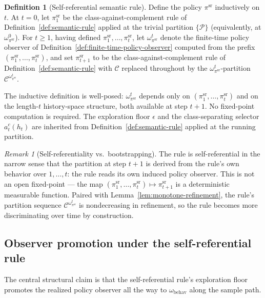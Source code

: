 \documentclass[11pt]{article}
\theoremstyle{definition}
\newtheorem{definition}[theorem]{Definition}
\theoremstyle{remark}
\newtheorem{remark}[theorem]{Remark}
\newcommand{\Ccal}{\mathcal{C}}
\newcommand{\Pcal}{\mathcal{P}}
\begin{document}
\begin{definition}[Self-referential semantic rule]
\label{def:self-ref-rule}
Define the policy $\pi^{\mathrm{sr}}$ inductively on $t$. At $t=0$, let $\pi^{\mathrm{sr}}_1$ be the class-against-complement rule of Definition~\ref{def:semantic-rule} applied at the trivial partition $\{\Pcal\}$ (equivalently, at $\omega_{\pi^{\mathrm{sr}}}^0$). For $t\ge 1$, having defined $\pi^{\mathrm{sr}}_1,\dots,\pi^{\mathrm{sr}}_t$, let $\omega_{\pi^{\mathrm{sr}}}^t$ denote the finite-time policy observer of Definition~\ref{def:finite-time-policy-observer} computed from the prefix $(\pi^{\mathrm{sr}}_1,\dots,\pi^{\mathrm{sr}}_t)$, and set $\pi^{\mathrm{sr}}_{t+1}$ to be the class-against-complement rule of Definition~\ref{def:semantic-rule} with $\Ccal$ replaced throughout by the $\omega_{\pi^{\mathrm{sr}}}^t$-partition $\Ccal^{\omega_{\pi^{\mathrm{sr}}}^t}$.
\end{definition}

The inductive definition is well-posed: $\omega_{\pi^{\mathrm{sr}}}^t$ depends only on $(\pi^{\mathrm{sr}}_1,\dots,\pi^{\mathrm{sr}}_t)$ and on the length-$t$ history-space structure, both available at step $t+1$. No fixed-point computation is required. The exploration floor $\epsilon$ and the class-separating selector $a_t^c(h_t)$ are inherited from Definition~\ref{def:semantic-rule} applied at the running partition.

\begin{remark}[Self-referentiality vs.\ bootstrapping]
\label{rem:self-reference-scope}
The rule is self-referential in the narrow sense that the partition at step $t+1$ is derived from the rule's own behavior over $1,\dots,t$: the rule reads its own induced policy observer. This is not an open fixed-point --- the map $(\pi^{\mathrm{sr}}_1,\dots,\pi^{\mathrm{sr}}_t)\mapsto\pi^{\mathrm{sr}}_{t+1}$ is a deterministic measurable function. Paired with Lemma~\ref{lem:monotone-refinement}, the rule's partition sequence $\Ccal^{\omega_{\pi^{\mathrm{sr}}}^t}$ is nondecreasing in refinement, so the rule becomes more discriminating over time by construction.
\end{remark}

\subsection{Observer promotion under the self-referential rule}
\label{sec:observer-promotion-sr}

The central structural claim is that the self-referential rule's exploration floor promotes the realized policy observer all the way to $\omega_{\mathrm{behav}}$ along the sample path.
\end{document}
